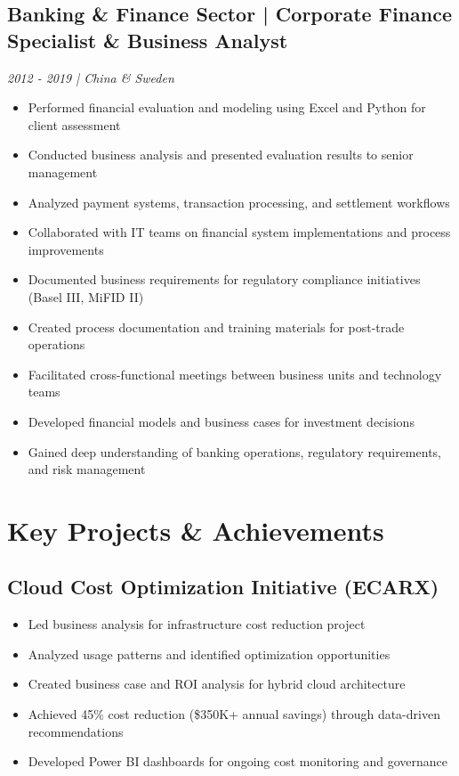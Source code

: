 \documentclass[11pt,a4paper]{article}
\begin{document}
\subsection*{Banking \& Finance Sector | Corporate Finance Specialist \& Business Analyst}
\textit{2012 - 2019 | China \& Sweden}

\begin{itemize}[leftmargin=*, itemsep=2pt]
\item Performed financial evaluation and modeling using Excel and Python for client assessment
\item Conducted business analysis and presented evaluation results to senior management
\item Analyzed payment systems, transaction processing, and settlement workflows
\item Collaborated with IT teams on financial system implementations and process improvements
\item Documented business requirements for regulatory compliance initiatives (Basel III, MiFID II)
\item Created process documentation and training materials for post-trade operations
\item Facilitated cross-functional meetings between business units and technology teams
\item Developed financial models and business cases for investment decisions
\item Gained deep understanding of banking operations, regulatory requirements, and risk management
\end{itemize}

\section*{Key Projects \& Achievements}

\subsection*{Cloud Cost Optimization Initiative (ECARX)}
\begin{itemize}[leftmargin=*, itemsep=1pt]
\item Led business analysis for infrastructure cost reduction project
\item Analyzed usage patterns and identified optimization opportunities
\item Created business case and ROI analysis for hybrid cloud architecture
\item Achieved 45\% cost reduction (\$350K+ annual savings) through data-driven recommendations
\item Developed Power BI dashboards for ongoing cost monitoring and governance
\end{itemize}
\end{document}
